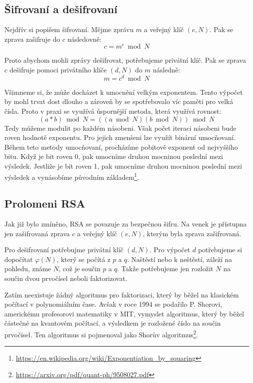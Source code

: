 \documentclass[11pt]{article}
\begin{document}
\subsection{Šifrovaní a dešifrovaní}
Nejdřív si popišem šifrovaní.
Mějme zprávu $m$ a veřejný klíč $(e, N)$.
Pak se zprava zašifruje do $c$ následovně:
$$c = m^e \bmod N$$
\par Proto abychom mohli zprávy dešifrovat, potřebujeme privátní klíč.
Pak se zprava $c$ dešifruje pomoci privátního klíče $(d, N)$ do $m$ následně:
$$m = c^d \bmod N$$
\par Všimneme si, že může docházet k umocnění velkým exponentem.
Tento výpočet by mohl trvat dost dlouho a zároveň by se spotřebovalo víc paměti pro velká čísla.
Proto v praxi se využívá úspornější metoda, která využívá rovnost:
$$(a * b) \bmod N = ((a \bmod N)(b \bmod N)) \bmod N$$
Tedy můžeme modulit po každém násobeni.
Však počet iteraci násobeni bude roven hodnotě exponentu.
Pro jejich zmenšeni lze využít binární umocňovaní.
Během teto metody umocňovaní, procházíme pobitově exponent od nejvyššího bitu.
Když je bit roven 0, pak umocníme druhou mocninou poslední mezi výsledek.
Jestliže je bit roven 1, pak umocníme druhou mocninou poslední mezi výsledek a vynásobíme původním základem\footnote{\url{https://en.wikipedia.org/wiki/Exponentiation_by_squaring}}.

\subsection{Prolomeni RSA}
Jak již bylo zmíněno, RSA se povazuje za bezpečnou šifru.
Na venek je přístupna jen zašifrovaná zprava $c$ a veřejný klíč $(e, N)$, kterým byla zprava zašifrovaná.

\par Pro dešifrovaní potřebujme privátní klíč $(d, N)$.
Pro výpočet $d$ potřebujeme si dopočítat $\varphi (N)$, který se počítá z $p$ a $q$.
Naštěstí nebo k neštěstí, záleží na pohledu, známe $N$, což je součin $p$ a $q$.
Takže potřebujeme jen rozložit $N$ na součin dvou prvočísel neboli faktorizovat.

\par Zatím neexistuje žádný algoritmus pro faktorizaci, který by běžel na klasickém počítací v polynomiálním čase.
Avšak v roce 1994 se podařilo P. Shorovi, americkému profesorovi matematiky v MIT, vymyslet algoritmus, který by běžel částečné na kvantovém počítací, a výsledkem je rozložené číslo na součin prvočísel.
Ten algoritmus si pojmenoval jako Shorův algoritmus\footnote{\url{https://arxiv.org/pdf/quant-ph/9508027.pdf}}.
\end{document}
